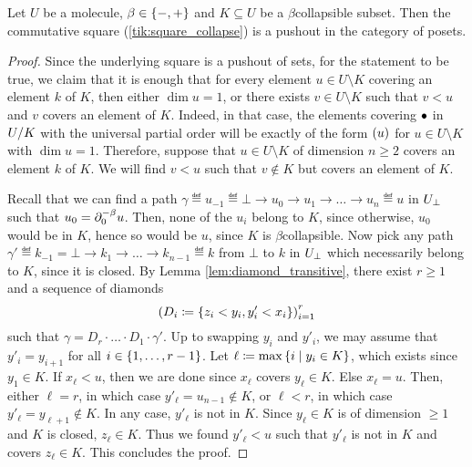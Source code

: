 \begin{lem} \label{lem:collapsible_is_puhsout}
    Let \( U \) be a molecule, \( \beta \in \set{-, +} \) and \( K \subseteq U \) be a \( \beta \)\nbd collapsible subset.
    Then the commutative square (\ref{tik:square_collapse}) is a pushout in the category of posets.
\end{lem}
\begin{proof}
    Since the underlying square is a pushout of sets, for the statement to be true, we claim that it is enough that for every element \( u \in U \setminus K \) covering an element \( k \) of \( K \), then either \( \dim u = 1 \), or there exists \( v \in U \setminus K \) such that \( v < u \) and \( v \) covers an element of \( K \).
    Indeed, in that case, the elements covering \( \zcoll \) in \( \coll{K}{U} \) with the universal partial order will be exactly of the form \( \icoll{u} \) for \( u \in U \setminus K \) with \( \dim u = 1 \). 
    Therefore, suppose that \( u \in U \setminus K \) of dimension \( n \geq 2 \) covers an element \( k \) of \( K \).
    We will find \( v < u \) such that \( v \notin K \) but covers an element of \( K \).

    Recall that we can find a path \( \gamma \eqdef u_{-1} \eqdef \bot \to u_0 \to u_1 \to \ldots \to u_n \eqdef u \) in \( \augm{U} \) such that \( u_0 = \bd{0}{-\beta} u \).
    Then, none of the \( u_i \) belong to \( K \), since otherwise, \( u_0 \) would be in \( K \), hence so would be \( u \), since \( K \) is \( \beta \)\nbd collapsible.
    Now pick any path \( \gamma' \eqdef k_{-1} = \bot \to k_1 \to \ldots \to k_{n - 1} \eqdef k \) from \( \bot \) to \( k \) in \( \augm{U} \) which necessarily belong to \( K \), since it is closed.
    By Lemma \ref{lem:diamond_transitive}, there exist \( r \geq 1 \) and a sequence of diamonds 
    \begin{equation*}
        \left(D_i \eqdef \set{z_i < y_i, y'_i < x_i}\right)_{i = 1}^r
    \end{equation*}
    such that \( \gamma = D_r \cdot \ldots \cdot D_1 \cdot \gamma' \).
    Up to swapping \( y_i \) and \( y'_i \), we may assume that \( y'_i = y_{i + 1} \) for all \( i \in \set{1, \ldots, r - 1} \).
    Let \( \ell \eqdef \max \set{i \mid y_i \in K} \), which exists since \( y_1 \in K \).
    If \( x_{\ell} < u \), then we are done since \( x_{\ell} \) covers \( y_{\ell} \in K \).
    Else \( x_{\ell} = u \).
    Then, either \( \ell = r \), in which case \( y'_{\ell} = u_{n - 1} \notin K \), or \( \ell < r \), in which case \( y'_{\ell} = y_{\ell + 1} \notin K \).
    In any case, \( y'_{\ell} \) is not in \( K \).
    Since \( y_{\ell} \in K \) is of dimension \( \geq 1 \) and \( K \) is closed, \( z_{\ell} \in K \).
    Thus we found \( y'_{\ell} < u \) such that \( y'_\ell \) is not in \( K \) and covers \( z_{\ell} \in K \).
    This concludes the proof.
\end{proof}



